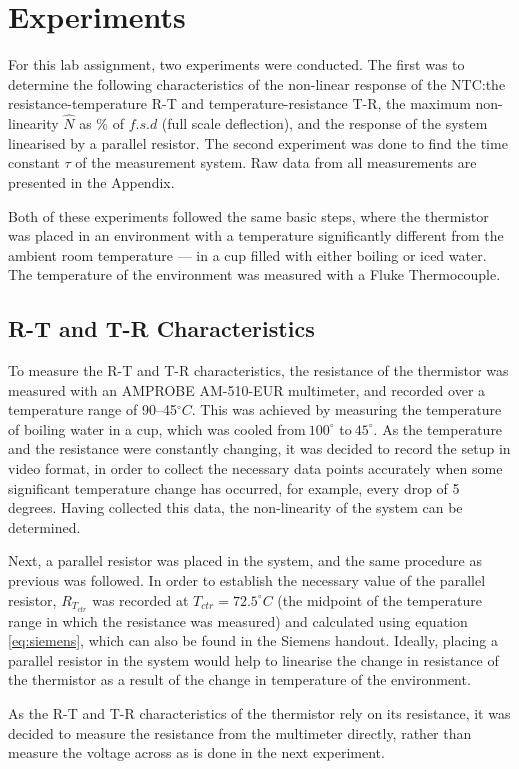 \documentclass[a4,11pt]{article}
\begin{document}
\section{Experiments}
For this lab assignment, two experiments were conducted. The first was to determine the following characteristics of the non-linear response of the NTC:\@ the resistance-temperature R-T and temperature-resistance T-R, the maximum non-linearity $\hat N$ as \% of $f.s.d$ (full scale deflection), and the response of the system linearised by a parallel resistor. The second experiment was done to find the time constant $\tau$ of the measurement system. Raw data from all measurements are presented in the Appendix.

Both of these experiments followed the same basic steps, where the thermistor was placed in an environment with a temperature significantly different from the ambient room temperature --- in a cup filled with either boiling or iced water. The temperature of the environment was measured with a Fluke Thermocouple.
\subsection{R-T and T-R Characteristics}
To measure the R-T and T-R characteristics, the resistance of the thermistor was measured with an AMPROBE AM-510-EUR multimeter, and recorded over a temperature range of 90--45$^{\circ}C$. This was achieved by measuring the temperature of boiling water in a cup, which was cooled from$~100^{\circ}$ to$~45^{\circ}$. As the temperature and the resistance were constantly changing, it was decided to record the setup in video format, in order to collect the necessary data points accurately when some significant temperature change has occurred, for example, every drop of 5 degrees. Having collected this data, the non-linearity of the system can be determined.

Next, a parallel resistor was placed in the system, and the same procedure as previous was followed. In order to establish the necessary value of the parallel resistor, $R_{T_{ctr}}$ was recorded at $T_{ctr}=72.5^{\circ}C$ (the midpoint of the temperature range in which the resistance was measured) and calculated using equation \ref{eq:siemens}, which can also be found in the Siemens handout. Ideally, placing a parallel resistor in the system would help to linearise the change in resistance of the thermistor as a result of the change in temperature of the environment.

As the R-T and T-R characteristics of the thermistor rely on its resistance, it was decided to measure the resistance from the multimeter directly, rather than measure the voltage across as is done in the next experiment.
\end{document}
